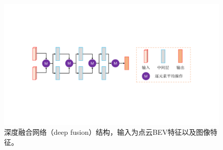 \begin{figure}[t]
	\centering
	\includegraphics[trim={4cm, 6cm, 4cm, 6cm}, clip, width=\textwidth]{imgs/fusion-network.pdf}
	\caption{深度融合网络（deep fusion）结构，输入为点云BEV特征以及图像特征。}
	\label{fig:fusion_network}
\end{figure}
